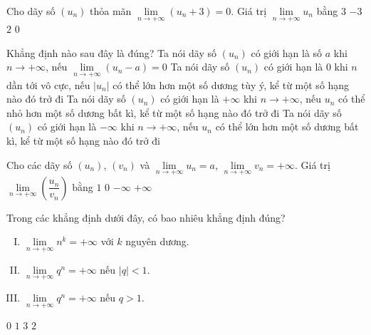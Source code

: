 \begin{ex}%
	Cho dãy số $\left( u_n\right)$ thỏa mãn $\lim\limits_{n\to +\infty} \left(u_n+3\right)=0$. Giá trị $\lim\limits_{n\to +\infty} u_n$ bằng
	\choice
	{$3$}
	{\True $-3$}
	{$2$}
	{$0$}
\end{ex}

\begin{ex}%
	Khẳng định nào sau đây là đúng?
	\choice
	{\True Ta nói dãy số $\left( u_n\right)$ có giới hạn là số $a$ khi $n\to +\infty$, nếu $\lim\limits_{n\to +\infty} \left(u_n-a\right)=0$}
	{Ta nói dãy số $\left( u_n\right)$ có giới hạn là $0$ khi $n$ dần tới vô cực, nếu $\left\vert u_n\right\vert$ có thể lớn hơn một số dương tùy ý, kể từ một số hạng nào đó trở đi}
	{Ta nói dãy số $\left( u_n\right)$ có giới hạn là $+\infty$ khi $n\to +\infty$, nếu $u_n$ có thể nhỏ hơn một số dương bất kì, kể từ một số hạng nào đó trở đi}
	{Ta nói dãy số $\left( u_n\right)$ có giới hạn là $-\infty$ khi $n\to +\infty$, nếu $u_n$ có thể lớn hơn một số dương bất kì, kể từ một số hạng nào đó trở đi}
\end{ex}	

\begin{ex}%
	Cho các dãy số $\left( u_n\right)$, $\left( v_n\right)$ và $\lim\limits_{n\to +\infty} u_n=a$, $\lim\limits_{n\to +\infty} v_n=+\infty$. Giá trị $\lim\limits_{n\to +\infty}\left( \dfrac{u_n}{v_n}\right)$ bằng
	\choice
	{$1$}
	{\True $0$}
	{$-\infty$}
	{$+\infty$}
\end{ex}

\begin{ex}%
	Trong các khẳng định dưới đây, có bao nhiêu khẳng định đúng?
	\begin{enumerate}[(I)]
		\item $\lim\limits_{n\to +\infty} n^k=+\infty$ với $k$ nguyên dương.
		\item $\lim\limits_{n\to +\infty} q^n=+\infty$ nếu $\vert q\vert < 1$.
		\item $\lim\limits_{n\to +\infty} q^n=+\infty$ nếu $q > 1$.		
	\end{enumerate}
	\choice
	{$0$}
	{$1$}
	{$3$}
	{\True $2$}
\end{ex}

